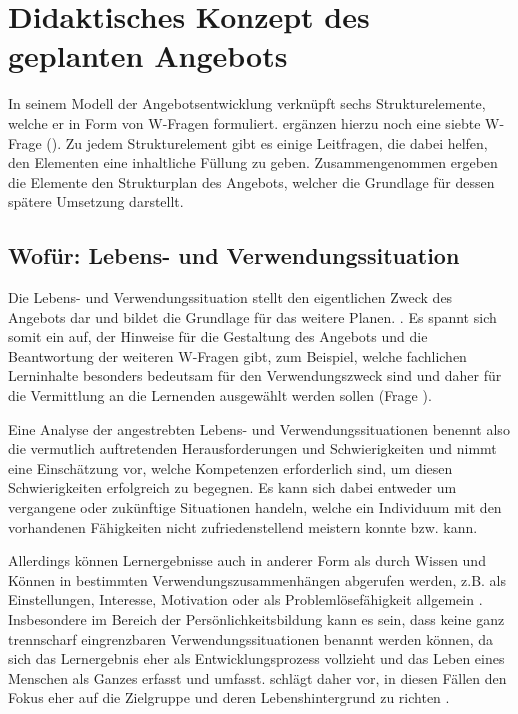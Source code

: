 \documentclass[
  twoside,
  parskip=half-,
]{scrreprt}
\begin{document}
\chapter{Didaktisches Konzept des geplanten Angebots}\label{chapter:didaktischeskonzept}

In seinem Modell der Angebotsentwicklung verknüpft \citeauthor{schlutz} sechs Strukturelemente, welche er in Form von W-Fragen formuliert. \citeauthor{fleige} ergänzen hierzu noch eine siebte W-Frage (). Zu jedem Strukturelement gibt es einige Leitfragen, die dabei helfen, den Elementen eine inhaltliche Füllung zu geben. Zusammengenommen ergeben die Elemente den Strukturplan des Angebots, welcher die Grundlage für dessen spätere Umsetzung darstellt. 

\section{Wofür: Lebens- und Verwendungssituation}
Die Lebens- und Verwendungssituation stellt den eigentlichen Zweck des Angebots dar und bildet die Grundlage für das weitere Planen. . Es spannt sich somit ein  auf, der Hinweise für die Gestaltung des Angebots und die Beantwortung der weiteren W-Fragen gibt, zum Beispiel, welche fachlichen Lerninhalte besonders bedeutsam für den Verwendungszweck sind und daher für die Vermittlung an die Lernenden ausgewählt werden sollen (Frage ).

Eine Analyse der angestrebten Lebens- und Verwendungssituationen benennt also die vermutlich auftretenden Herausforderungen und Schwierigkeiten und nimmt eine Einschätzung vor, welche Kompetenzen erforderlich sind, um diesen Schwierigkeiten erfolgreich zu begegnen. Es kann sich dabei entweder um vergangene oder zukünftige Situationen handeln, welche ein Individuum mit den vorhandenen Fähigkeiten nicht zufriedenstellend meistern konnte bzw. kann.

Allerdings können Lernergebnisse auch in anderer Form als durch Wissen und Können in bestimmten Verwendungszusammenhängen abgerufen werden, z.B. als Einstellungen, Interesse, Motivation oder als Problemlösefähigkeit allgemein \autocite[vgl.][94]{schlutz}. Insbesondere im Bereich der Persönlichkeitsbildung kann es sein, dass keine ganz trennscharf eingrenzbaren Verwendungssituationen benannt werden können, da sich das Lernergebnis eher als Entwicklungsprozess vollzieht und das Leben eines Menschen als Ganzes erfasst und umfasst. \citeauthor{schlutz} schlägt daher vor, in diesen Fällen den Fokus eher auf die Zielgruppe und deren Lebenshintergrund zu richten \autocite[vgl.][94]{schlutz}. 
\end{document}
